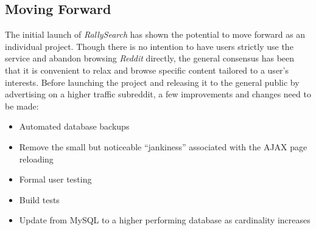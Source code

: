 \documentclass[msc,oneside]{ubcthesis}%
\begin{document}
\subsection{Moving Forward}
The initial launch of \textit{RallySearch} has shown the potential to move forward as an individual project. Though there is no intention to have users strictly use the service and abandon browsing \textit{Reddit} directly, the general consensus has been that it is convenient to relax and browse specific content tailored to a user's interests. Before launching the project and releasing it to the general public by advertising on a higher traffic subreddit, a few improvements and changes need to be made:
\begin{itemize}
\item{Automated database backups}
\item{Remove the small but noticeable ``jankiness'' associated with the AJAX page reloading}
\item{Formal user testing}
\item{Build tests}
\item{Update from MySQL to a higher performing database as cardinality increases}
\end{itemize}

\newpage %
\pagestyle{fancy}\rhead{}\cfoot{}\rfoot{\thepage}

\end{document}
